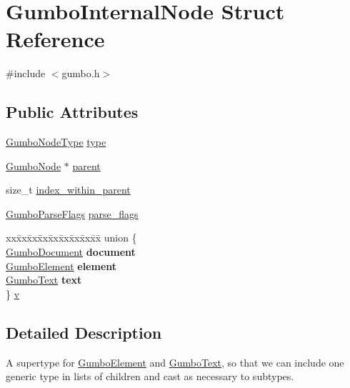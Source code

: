 \hypertarget{struct_gumbo_internal_node}{}\section{Gumbo\+Internal\+Node Struct Reference}
\label{struct_gumbo_internal_node}


{\ttfamily \#include $<$gumbo.\+h$>$}

\subsection*{Public Attributes}
\begin{DoxyCompactItemize}
\item 
\mbox{\hyperlink{gumbo_8h_a74e7c5d1cb8189fcfad8443ce4c44ee0}{Gumbo\+Node\+Type}} \mbox{\hyperlink{struct_gumbo_internal_node_a8cd3706811e3d9558958dcae9f87eed9}{type}}
\item 
\mbox{\hyperlink{gumbo_8h_a5f67d8397fda8fb7c90cc27f14ac4e7d}{Gumbo\+Node}} $\ast$ \mbox{\hyperlink{struct_gumbo_internal_node_ad466c80e05d66ac5f44357591301edc1}{parent}}
\item 
size\+\_\+t \mbox{\hyperlink{struct_gumbo_internal_node_a67a8817baad26cf4787620b8123e6754}{index\+\_\+within\+\_\+parent}}
\item 
\mbox{\hyperlink{gumbo_8h_a74ff2c74a4bf7777efb2b9a29315e74b}{Gumbo\+Parse\+Flags}} \mbox{\hyperlink{struct_gumbo_internal_node_a9ed83315056ffcd3b81eaf3db6965d65}{parse\+\_\+flags}}
\item 
\begin{tabbing}
xx\=xx\=xx\=xx\=xx\=xx\=xx\=xx\=xx\=\kill
union \{\\
\>\mbox{\hyperlink{struct_gumbo_document}{GumboDocument}} {\bfseries document}\\
\>\mbox{\hyperlink{struct_gumbo_element}{GumboElement}} {\bfseries element}\\
\>\mbox{\hyperlink{struct_gumbo_text}{GumboText}} {\bfseries text}\\
\} \mbox{\hyperlink{struct_gumbo_internal_node_af96cda8b23b42df19d16a27a857515a2}{v}}\\

\end{tabbing}\end{DoxyCompactItemize}


\subsection{Detailed Description}
A supertype for \mbox{\hyperlink{struct_gumbo_element}{Gumbo\+Element}} and \mbox{\hyperlink{struct_gumbo_text}{Gumbo\+Text}}, so that we can include one generic type in lists of children and cast as necessary to subtypes. 

